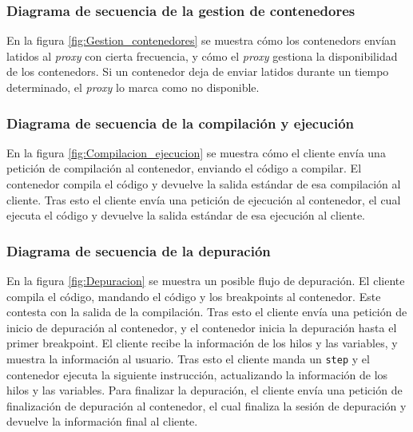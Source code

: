 
\FloatBarrier

\subsubsection{Diagrama de secuencia de la gestion de contenedores} \label{subsec:diagrama-secuencia-gestion-contenedores}

En la figura \ref{fig:Gestion_contenedores} se muestra cómo los \glspl{contenedor} envían latidos al \textit{\gls{proxy}} con cierta frecuencia, y cómo el \textit{\gls{proxy}} gestiona la disponibilidad de los \glspl{contenedor}. Si un \gls{contenedor} deja de enviar latidos durante un tiempo determinado, el \textit{\gls{proxy}} lo marca como no disponible.

\FloatBarrier

\subsubsection{Diagrama de secuencia de la compilación y ejecución} \label{subsec:diagrama-secuencia-compilacion-ejecucion}
En la figura \ref{fig:Compilacion_ejecucion} se muestra cómo el cliente envía una petición de \gls{compilación} al \gls{contenedor}, enviando el código a compilar. El \gls{contenedor} compila el código y devuelve la salida estándar de esa \gls{compilación} al cliente.
Tras esto el cliente envía una petición de ejecución al \gls{contenedor}, el cual ejecuta el código y devuelve la salida estándar de esa ejecución al cliente.

\FloatBarrier

\subsubsection{Diagrama de secuencia de la depuración} \label{subsec:diagrama-secuencia-depuracion}
En la figura \ref{fig:Depuracion} se muestra un posible flujo de depuración. El cliente compila el código, mandando el código y los breakpoints al \gls{contenedor}. Este contesta con la salida de la \gls{compilación}.
Tras esto el cliente envía una petición de inicio de depuración al \gls{contenedor}, y el \gls{contenedor} inicia la depuración hasta el primer breakpoint. El cliente recibe la información de los \glspl{hilo} y las variables, y muestra la información al usuario.
Tras esto el cliente manda un \texttt{step} y el \gls{contenedor} ejecuta la siguiente instrucción, actualizando la información de los \glspl{hilo} y las variables.
Para finalizar la depuración, el cliente envía una petición de finalización de depuración al \gls{contenedor}, el cual finaliza la sesión de depuración y devuelve la información final al cliente.

